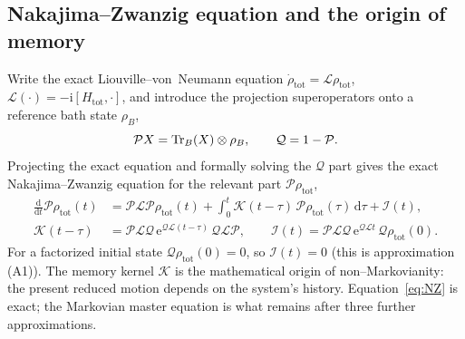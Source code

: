 \documentclass[11pt,a4paper]{article}
\theoremstyle{plain}
\theoremstyle{definition}
\theoremstyle{remark}
\newcommand{\ee}{\mathrm{e}}
\newcommand{\ii}{\mathrm{i}}
\newcommand{\calL}{\mathcal{L}}
\newcommand{\calK}{\mathcal{K}}
\newcommand{\calP}{\mathcal{P}}
\newcommand{\calQ}{\mathcal{Q}}
\newcommand{\calI}{\mathcal{I}}
\renewcommand{\dd}{\mathrm{d}}
\begin{document}
\subsection{Nakajima--Zwanzig equation and the origin of memory}
\label{sec:NZ}
Write the exact Liouville--von~Neumann equation
$\dot\rho_{\mathrm{tot}}=\calL\rho_{\mathrm{tot}}$,
$\calL(\cdot)=-\ii[H_{\mathrm{tot}},\cdot]$, and introduce the projection
superoperators onto a reference bath state $\rho_B$,
\begin{equation}
\calP X = \Tr_B(X)\otimes\rho_B,\qquad \calQ=1-\calP .
\end{equation}
Projecting the exact equation and formally solving the $\calQ$ part gives
the exact Nakajima--Zwanzig equation for the relevant part
$\calP\rho_{\mathrm{tot}}$,
\begin{align}
\frac{\dd}{\dd t}\calP\rho_{\mathrm{tot}}(t)
&= \calP\calL\calP\rho_{\mathrm{tot}}(t)
+ \int_0^t \calK(t-\tau)\,\calP\rho_{\mathrm{tot}}(\tau)\,\dd\tau
+ \calI(t),
\label{eq:NZ}\\
\calK(t-\tau) &= \calP\calL\calQ\,\ee^{\calQ\calL(t-\tau)}\,\calQ\calL\calP,
\qquad
\calI(t)=\calP\calL\calQ\,\ee^{\calQ\calL t}\,\calQ\rho_{\mathrm{tot}}(0).
\end{align}
For a factorized initial state $\calQ\rho_{\mathrm{tot}}(0)=0$, so
$\calI(t)=0$ (this is approximation (A1)). The memory kernel $\calK$ is
the mathematical origin of non--Markovianity: the present reduced motion
depends on the system's history. Equation~\eqref{eq:NZ} is exact; the
Markovian master equation is what remains after three further
approximations.
\end{document}
